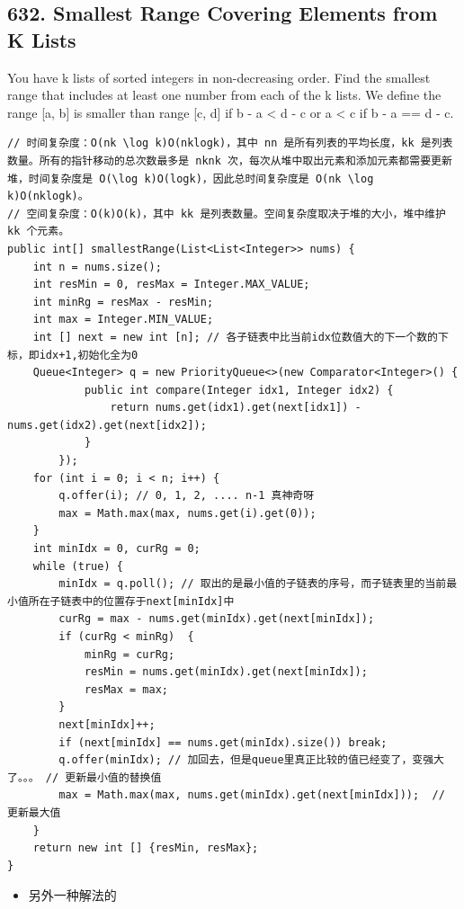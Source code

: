 \documentclass[9pt, b5paper]{article}
\begin{document}
\subsection{632. Smallest Range Covering Elements from K Lists}
\label{sec-7-2}
You have k lists of sorted integers in non-decreasing order. Find the smallest range that includes at least one number from each of the k lists.
We define the range [a, b] is smaller than range [c, d] if b - a < d - c or a < c if b - a == d - c.
\begin{verbatim}
// 时间复杂度：O(nk \log k)O(nklogk)，其中 nn 是所有列表的平均长度，kk 是列表数量。所有的指针移动的总次数最多是 nknk 次，每次从堆中取出元素和添加元素都需要更新堆，时间复杂度是 O(\log k)O(logk)，因此总时间复杂度是 O(nk \log k)O(nklogk)。
// 空间复杂度：O(k)O(k)，其中 kk 是列表数量。空间复杂度取决于堆的大小，堆中维护 kk 个元素。
public int[] smallestRange(List<List<Integer>> nums) {
    int n = nums.size();
    int resMin = 0, resMax = Integer.MAX_VALUE;
    int minRg = resMax - resMin;
    int max = Integer.MIN_VALUE;
    int [] next = new int [n]; // 各子链表中比当前idx位数值大的下一个数的下标，即idx+1,初始化全为0
    Queue<Integer> q = new PriorityQueue<>(new Comparator<Integer>() {
            public int compare(Integer idx1, Integer idx2) {
                return nums.get(idx1).get(next[idx1]) - nums.get(idx2).get(next[idx2]);
            }
        });
    for (int i = 0; i < n; i++) {
        q.offer(i); // 0, 1, 2, .... n-1 真神奇呀
        max = Math.max(max, nums.get(i).get(0));
    }
    int minIdx = 0, curRg = 0;
    while (true) {
        minIdx = q.poll(); // 取出的是最小值的子链表的序号，而子链表里的当前最小值所在子链表中的位置存于next[minIdx]中
        curRg = max - nums.get(minIdx).get(next[minIdx]);
        if (curRg < minRg)  {
            minRg = curRg;
            resMin = nums.get(minIdx).get(next[minIdx]);
            resMax = max;
        }
        next[minIdx]++;
        if (next[minIdx] == nums.get(minIdx).size()) break;
        q.offer(minIdx); // 加回去，但是queue里真正比较的值已经变了，变强大了。。。 // 更新最小值的替换值 
        max = Math.max(max, nums.get(minIdx).get(next[minIdx]));  // 更新最大值
    }
    return new int [] {resMin, resMax};
}
\end{verbatim}
\begin{itemize}
\item 另外一种解法的
\end{itemize}
\end{document}
